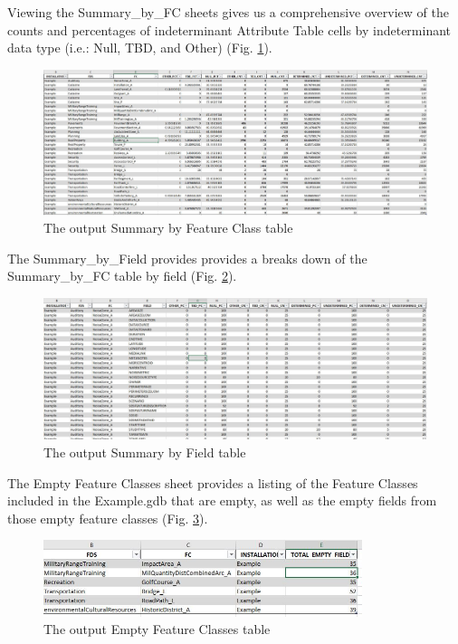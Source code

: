 \documentclass[openany]{book}
\theoremstyle{definition}
\theoremstyle{definition}
\theoremstyle{definition}
\theoremstyle{remark}
\begin{document}
Viewing the Summary\_by\_FC sheets gives us a comprehensive overview of
the counts and percentages of indeterminant Attribute Table cells by
indeterminant data type (i.e.: Null, TBD, and Other) (Fig.
\ref{fig:summIndtsheet1}).

\begin{figure}[H]

{\centering \includegraphics[width=9.41in,]{figures/summIndt-sheet1} 

}

\caption{The output Summary by Feature Class table}\label{fig:summIndtsheet1}
\end{figure}

The Summary\_by\_Field provides provides a breaks down of the
Summary\_by\_FC table by field (Fig. \ref{fig:summIndtsheet2}).

\begin{figure}[H]

{\centering \includegraphics[width=8.36in,]{figures/summIndt-sheet2} 

}

\caption{The output Summary by Field table}\label{fig:summIndtsheet2}
\end{figure}

The Empty Feature Classes sheet provides a listing of the Feature
Classes included in the Example.gdb that are empty, as well as the empty
fields from those empty feature classes (Fig. \ref{fig:summIndtsheet3}).

\begin{figure}[H]

{\centering \includegraphics[width=3.67in,]{figures/summIndt-sheet3} 

}

\caption{The output Empty Feature Classes table}\label{fig:summIndtsheet3}
\end{figure}
\end{document}
